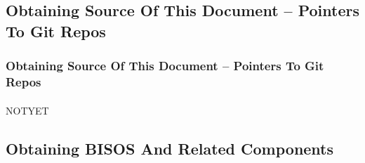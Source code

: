 \subsection{Obtaining Source Of This Document -- Pointers To Git Repos}


\begin{comment}
*****  [[elisp:(org-cycle)][| ]]  [[elisp:(blee:ppmm:org-mode-toggle)][Nat]] [[elisp:(beginning-of-buffer)][Top]] [[elisp:(delete-other-windows)][(1)]] || /Frame/ *Label=ObtainingSourceOfThisDocument--PointersToGitRepos*  Obtaining Source Of This Document -- Pointers To Git Repos ::  [[elisp:(org-cycle)][| ]]
\end{comment}

\begin{frame}[fragile,label=ObtainingSourceOfThisDocument--PointersToGitRepos]
    \frametitle{Obtaining Source Of This Document -- Pointers To Git Repos}
    \framesubtitle{}

    NOTYET
    
\end{frame}

\begin{comment}
**  [[elisp:(org-cycle)][| ]] [[elisp:(org-show-subtree)][|=]] [[elisp:(show-children 10)][|V]] [[elisp:(bx:orgm:indirectBufOther)][|>]] [[elisp:(bx:orgm:indirectBufMain)][|I]] [[elisp:(blee:ppmm:org-mode-toggle)][|N]] [[elisp:(org-top-overview)][|O]] [[elisp:(progn (org-shifttab) (org-content))][|C]] [[elisp:(delete-other-windows)][|1]]  /Subsection/   Obtaining BISOS And Related Components ::  [[elisp:(org-cycle)][| ]]
\end{comment}

\subsection{Obtaining BISOS And Related Components}


\begin{comment}
*****  [[elisp:(org-cycle)][| ]]  [[elisp:(blee:ppmm:org-mode-toggle)][Nat]] [[elisp:(beginning-of-buffer)][Top]] [[elisp:(delete-other-windows)][(1)]] || /Frame/ *Label=ObtainingSourceOfThisDocument--PointersToGitRepos*  Obtaining Source Of This Document -- Pointers To Git Repos ::  [[elisp:(org-cycle)][| ]]
\end{comment}


